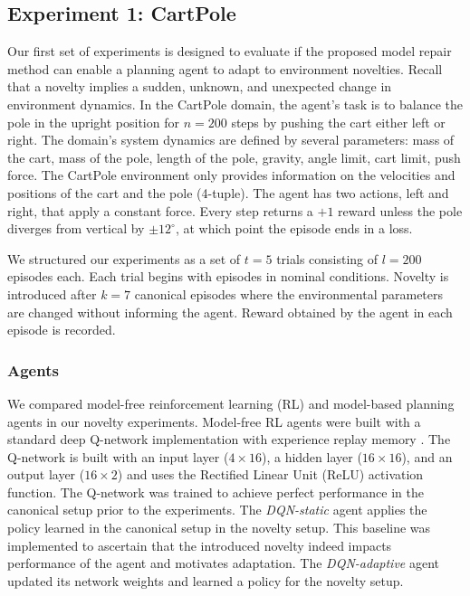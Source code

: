 \documentclass[letterpaper]{article} %
\begin{document}
\subsection{Experiment 1: CartPole}
Our first set of experiments is designed to evaluate if the proposed model repair method can enable a planning agent to adapt to environment novelties. Recall that a novelty implies a sudden, unknown, and unexpected change in environment dynamics. In the CartPole domain, the agent's task is to balance the pole in the upright position for $n=200$ steps by pushing the cart either left or right. The domain's system dynamics are defined by several parameters: mass of the cart, mass of the pole, length of the pole, gravity, angle limit, cart limit, push force. The CartPole environment only provides information on the velocities and positions of the cart and the pole (4-tuple). The agent has two actions, left and right, that apply a constant force. Every step returns a $+1$ reward unless the pole diverges from vertical by $\pm 12^{\circ}$, at which point the episode ends in a loss. 

We structured our experiments as a set of $t=5$ trials consisting of $l=200$ episodes each. Each trial begins with episodes in nominal conditions. Novelty is introduced after $k=7$ canonical episodes where the environmental parameters are changed without informing the agent. Reward obtained by the agent in each episode is recorded.

\subsubsection{Agents}
We compared model-free reinforcement learning (RL) and model-based planning agents in our novelty experiments. Model-free RL agents were built with a standard deep Q-network implementation with experience replay memory \cite{mnih2013playing}. The Q-network is built with an input layer ($4 \times 16$), a hidden layer ($16 \times 16$), and an output layer ($16 \times 2$) and uses the Rectified Linear Unit (ReLU) activation function. The Q-network was trained to achieve perfect performance in the canonical setup prior to the experiments. The \emph{DQN-static} agent applies the policy learned in the canonical setup in the novelty setup. This baseline was implemented to ascertain that the introduced novelty indeed impacts performance of the agent and motivates adaptation. The \emph{DQN-adaptive} agent updated its network weights and learned a policy for the novelty setup.
\end{document}
